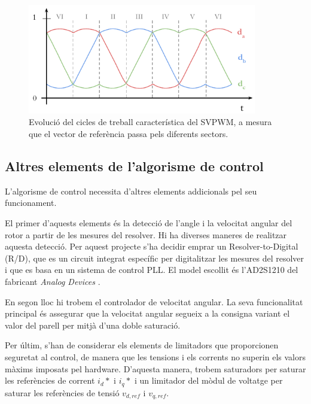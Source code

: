 {{        \begin{figure}[!htb]
            \centering
            \captionsetup{justification=centering}
            \includegraphics[width=10cm]
                { img/3_control_motor/duty.pdf }
            \caption[Cicles de treball obtinguts amb SVPWM]
                { 
                    Evolució del cicles de treball característica del SVPWM, a
                    mesura que el vector de referència passa pels diferents
                    sectors. 
                }          
        \end{figure}
    }

    \newpage
    \subsection{ Altres elements de l'algorisme de control }
    {
        L'algorisme de control necessita d'altres elements addicionals pel seu
        funcionament. 
        
        El primer d'aquests elements és la detecció de l'angle i la velocitat
        angular del rotor a partir de les mesures del resolver. Hi ha diverses
        maneres de realitzar aquesta detecció. Per aquest projecte
        s'ha decidir emprar un Resolver-to-Digital (\acs{R/D}), que es un circuit
        integrat específic per digitalitzar les mesures del resolver i que es
        basa en un sistema de control PLL. El model escollit és l'AD2S1210
        del fabricant \emph{Analog Devices} \cite{rtd}.
        
        En segon lloc hi trobem el controlador de velocitat angular. La seva
        funcionalitat principal és assegurar que la velocitat angular segueix a
        la consigna variant el valor del parell per mitjà d'una doble saturació.
    
        Per últim, s'han de considerar els elements de limitadors que
        proporcionen seguretat al control, de manera que les tensions i els
        corrents no superin els valors màxims imposats pel hardware. D'aquesta
        manera, trobem saturadors per saturar les referències de corrent $i_d*$
        i $i_q*$ i un limitador del mòdul de voltatge per saturar les
        referències de tensió $v_{d,ref}$ i $v_{q,ref}$.

}}
